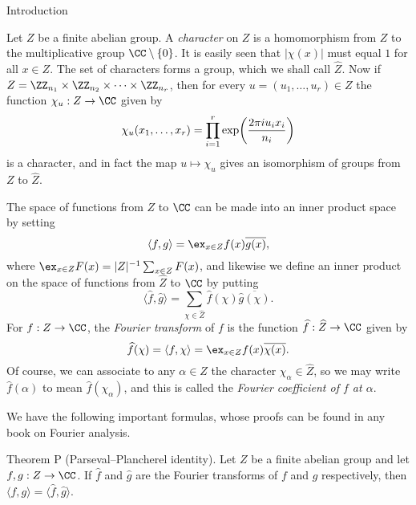 


\def\FF{{\bf F}}
\def\TT{{\bf T}}
\def\bar{\overline}
\def\hat{\widehat}
\def\norm#1{|\!|#1|\!|}
\def\bignorm#1{\big|\!\big|#1\big|\!\big|}
\def\Norm#1{\Big|\!\Big|#1\Big|\!\Big|}
\def\normm#1{\bigg|\!\bigg|#1\bigg|\!\bigg|}
\def\supp{\op{{\rm supp}}}
\def\smallsupp{\op{{\sevenrm supp}}}
\def\divides{\backslash}

\widemargins
{}


\bigskip

\advsect Introduction

Let $Z$ be a finite abelian group. A {\it character} on $Z$ is a homomorphism from $Z$ to the multiplicative
group $\CC\setminus \{0\}$. It is easily seen that $|\chi(x)|$ must equal $1$ for all $x\in Z$.
The set of characters forms a group, which we shall call $\hat Z$.
Now if $Z = \ZZ_{n_1}\times \ZZ_{n_2} \times\cdots\times \ZZ_{n_r}$, then for every $u = (u_1,\ldots,u_r)\in Z$
the function $\chi_u : Z\to \CC$ given by
$$\chi_u(x_1,\ldots,x_r) = \prod_{i=1}^r \exp\biggl( {2\pi i u_i x_i\over n_i} \biggr)$$
is a character, and in fact the map $u\mapsto \chi_u$ gives an isomorphism of groups from $Z$ to $\hat Z$.

The space of functions from $Z$ to $\CC$ can be made into an inner product space by setting
$$\langle f,g\rangle = \ex_{x\in Z} f(x)\bar{g(x)},$$
where $\ex_{x\in Z} F(x) = |Z|^{-1} \sum_{x\in Z} F(x)$, and likewise we define an inner product on
the space of functions from $\hat Z$ to $\CC$ by putting
$$\langle \hat f, \hat g\rangle = \sum_{\chi \in \hat Z} \hat f(\chi) \bar{\hat g(\chi)}.$$
For $f:Z\to \CC$, the {\it Fourier transform} of $f$ is the function $\hat f : \hat Z\to \CC$ given by
$$ \hat f(\chi) = \langle f,\chi\rangle
= \ex_{x\in Z} f(x) \bar{\chi(x)}.$$
Of course, we can associate to any $\alpha\in Z$ the character $\chi_\alpha\in \hat Z$, so we may write
$\hat f(\alpha)$ to mean $\hat f(\chi_\alpha)$, and this is called the {\it Fourier coefficient
of $f$ at $\alpha$}.

We have the following important formulas, whose proofs
can be found in any book on Fourier analysis.

\parenproclaim Theorem P (Parseval--Plancherel identity). Let $Z$ be a finite abelian group and
let $f,g : Z\to \CC$. If $\hat f$ and $\hat g$ are the Fourier transforms of $f$ and $g$ respectively,
then $\langle f,g \rangle = \langle \hat f, \hat g\rangle$.\slug

